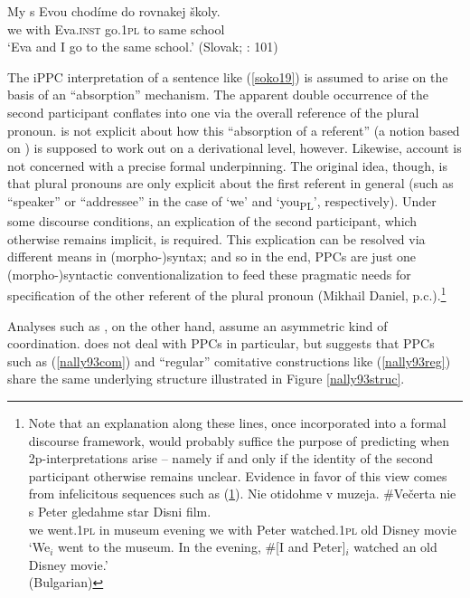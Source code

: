 \documentclass[output=paper,colorlinks,citecolor=brown]{langscibook}
\begin{document}
\ea
\gll My s Evou chodíme do rovnakej školy. \\
we with Eva.\textsc{inst} go.\textsc{1pl} to same school \\
 \glt `Eva and I go to the same school.' \hfill (Slovak; \cite{Sokolova2019}: 101) \label{soko19}
\z

\noindent The iPPC interpretation of a sentence like (\ref{soko19}) is assumed to arise on the basis of an ``absorption'' mechanism. The apparent double occurrence of the second participant conflates into one via the overall reference of the plural pronoun. \citet{Sokolova2019} is not explicit about how this ``absorption of a referent'' (a notion based on \cite{Daniel2000}) is supposed to work out on a derivational level, however. Likewise,  account is not concerned with a precise formal underpinning. The original idea, though, is that plural pronouns are only explicit about the first referent in general (such as ``speaker'' or ``addressee'' in the case of `we' and `you\textsubscript{PL}', respectively). Under some discourse conditions, an explication of the second participant, which otherwise remains implicit, is required. This explication can be resolved via different means in (morpho-)syntax; and so in the end, PPCs are just one (morpho-)syntactic conventionalization to feed these pragmatic needs for specification of the other referent of the plural pronoun (Mikhail Daniel, p.c.).\footnote{Note that an explanation along these lines, once incorporated into a formal discourse framework, would probably suffice the purpose of predicting when 2p-interpretations arise -- namely if and only if the identity of the second participant otherwise remains unclear. Evidence in favor of this view comes from infelicitous sequences such as (\ref{bg:disni}). 
\ea
\gll Nie otidohme v muzeja. \#Večerta nie s Peter gledahme star Disni film. \\
 we went.\textsc{1pl} in museum evening we with Peter watched.\textsc{1pl} old Disney movie \\
 \glt `We$_i$ went to the museum. In the evening, \#[I and Peter]$_i$ watched an old Disney movie.' \\
 \hfill (Bulgarian)\label{bg:disni}
\z
}


Analyses such as , on the other hand, assume an asymmetric kind of coordination. \citet{McNally1993} does not deal with PPCs in particular, but suggests that PPCs such as (\ref{nally93com}) and ``regular'' comitative constructions like (\ref{nally93reg}) share the same underlying structure illustrated in Figure \ref{nally93struc}.
\end{document}
